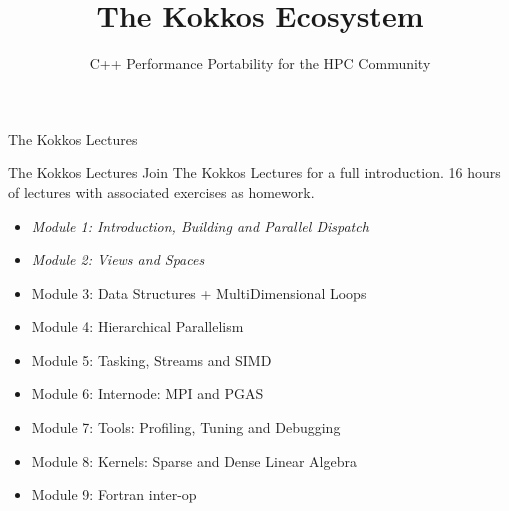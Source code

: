 
\usepackage{tikz}
\def\sandid{SAND2020-7755 PE}

\title{The Kokkos Ecosystem}

\author{C++ Performance Portability for the HPC Community}




\shorttrue
\mediumfalse
\fullfalse



% 

\begin{frame}
	\titlepage
\end{frame}



\begin{frame}{The Kokkos Lectures}
        
	\begin{block}{The Kokkos Lectures}
		Join The Kokkos Lectures for a full introduction. 16 hours of lectures with associated exercises as homework.
	\end{block}

\begin{itemize}
	\item \textit{Module 1: Introduction, Building and Parallel Dispatch}
	\item \textit{Module 2: Views and Spaces}
	\item Module 3: Data Structures + MultiDimensional Loops
	\item Module 4: Hierarchical Parallelism
	\item Module 5: Tasking, Streams and SIMD
	\item Module 6: Internode: MPI and PGAS
	\item Module 7: Tools: Profiling, Tuning and Debugging
	\item Module 8: Kernels: Sparse and Dense Linear Algebra
    \item Module 9: Fortran inter-op
\end{itemize}
\end{frame}

